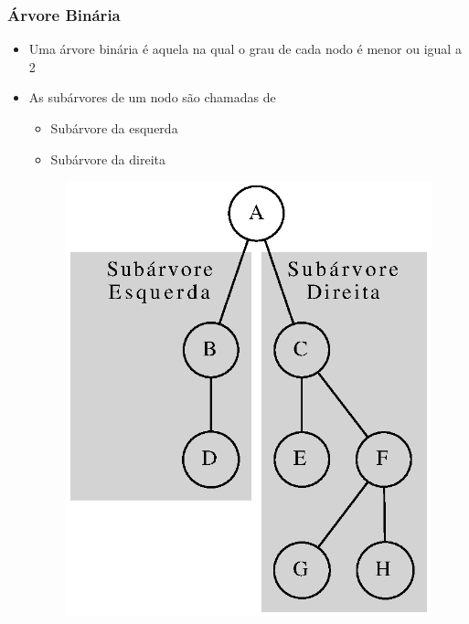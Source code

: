 \documentclass[aspectratio=169]{beamer}
\begin{document}
\begin{frame}[fragile]\frametitle{Árvore Binária}
\begin{itemize}
	\item Uma árvore binária é aquela na qual o grau de cada nodo é menor ou igual a 2
	\item As subárvores de um nodo são chamadas de
	\begin{itemize}
		\item Subárvore da esquerda
		\item Subárvore da direita
	\end{itemize}
\begin{figure}[h]
	\centering
	\includegraphics[height=0.5\paperheight]{imagens/arvore_binaria01-v2.eps}
\end{figure}
\end{itemize}
\end{frame}
\end{document}
